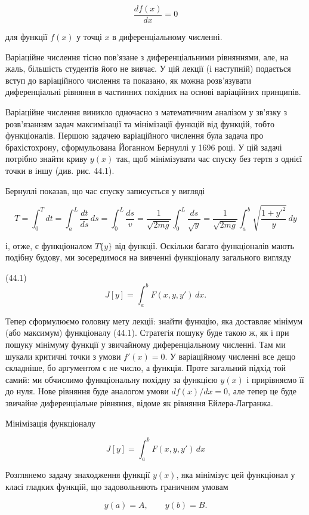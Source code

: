 \documentclass[
  ukrainian,
]{article}
\begin{document}
\[
\frac{df(x)}{dx} = 0
\]

для функції \(f(x)\) у точці \(x\) в диференціальному численні.

Варіаційне числення тісно пов'язане з диференціальними рівняннями, але,
на жаль, більшість студентів його не вивчає. У цій лекції (і наступній)
подається вступ до варіаційного числення та показано, як можна
розв'язувати диференціальні рівняння в частинних похідних на основі
варіаційних принципів.

Варіаційне числення виникло одночасно з математичним аналізом у зв'язку
з розв'язанням задач максимізації та мінімізації функцій від функцій,
тобто функціоналів. Першою задачею варіаційного числення була задача про
брахістохрону, сформульована Йоганном Бернуллі у 1696 році. У цій задачі
потрібно знайти криву \(y(x)\) так, щоб мінімізувати час спуску без
тертя з однієї точки в іншу (див. рис. 44.1).

Бернуллі показав, що час спуску записується у вигляді

\[
T = \int_0^T dt = \int_a^L \frac{dt}{ds}\,ds = \int_0^L \frac{ds}{v}
= \frac{1}{\sqrt{2mg}} \int_0^L \frac{ds}{\sqrt{y}}
= \frac{1}{\sqrt{2mg}} \int_a^b \sqrt{\frac{1+y'^2}{y}}\,dy
\]

і, отже, є функціоналом \(T\{y\}\) від функції. Оскільки багато
функціоналів мають подібну будову, ми зосередимося на вивченні
функціоналу загального вигляду

(44.1) \[
J[y] = \int_a^b F(x, y, y')\,dx.
\]

Тепер сформулюємо головну мету лекції: знайти функцію, яка доставляє
мінімум (або максимум) функціоналу (44.1). Стратегія пошуку буде такою
ж, як і при пошуку мінімуму функції у звичайному диференціальному
численні. Там ми шукали критичні точки з умови \(f'(x)=0\). У
варіаційному численні все дещо складніше, бо аргументом є не число, а
функція. Проте загальний підхід той самий: ми обчислимо функціональну
похідну за функцією \(y(x)\) і прирівняємо її до нуля. Нове рівняння
буде аналогом умови \(df(x)/dx = 0\), але тепер це буде звичайне
диференціальне рівняння, відоме як рівняння Ейлера-Лагранжа.

Мінімізація функціоналу

\[
J[y] = \int_a^b F(x, y, y')\,dx
\]

Розглянемо задачу знаходження функції \(y(x)\), яка мінімізує цей
функціонал у класі гладких функцій, що задовольняють граничним умовам

\[
y(a) = A, \qquad y(b) = B.
\]
\end{document}
